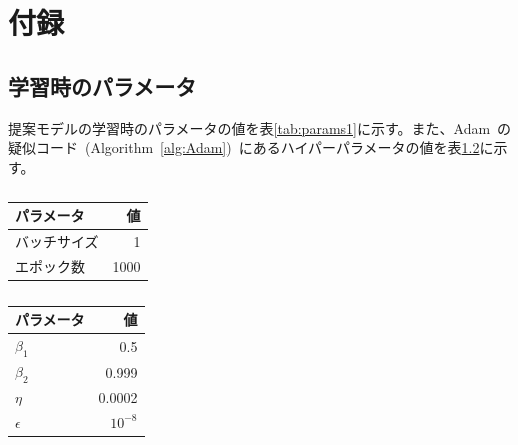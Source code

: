 \chapter{付録}

\section{学習時のパラメータ}
\label{sec:appendix_params}

提案モデルの学習時のパラメータの値を表\ref{tab:params1}に示す。また、Adam~\cite{Adam}の疑似コード~(Algorithm~\ref{alg:Adam})~にあるハイパーパラメータの値を表\ref{tab:params2}に示す。

\begin{table}[b]
\begin{center}
\begin{minipage}{0.49\hsize}
    \begin{center}
        \begin{tabular}{lr}\toprule
            パラメータ & 値 \\ \midrule
            バッチサイズ & 1 \\ 
            エポック数 & 1000 \\ \bottomrule
        \end{tabular}
    \end{center}
    \caption{}
    \label{tab:params1}
\end{minipage}
\begin{minipage}{0.49\hsize}
    \begin{center}
        \begin{tabular}{lr}\toprule
            パラメータ & 値 \\ \midrule
            $\beta_1$ & 0.5 \\
            $\beta_2$ & 0.999 \\
            $\eta$ & 0.0002 \\ 
            $\epsilon$ & $10^{-8}$ \\ \bottomrule
        \end{tabular}
    \end{center}
    \caption{}
    \label{tab:params2}
\end{minipage}
\end{center}
\end{table}

